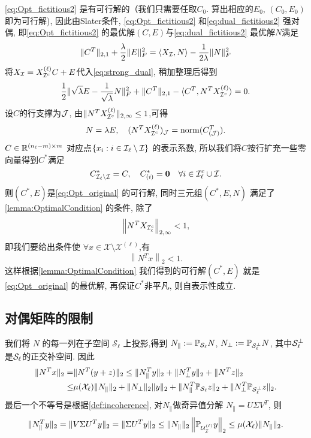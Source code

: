 \eqref{eq:Opt_fictitious2} 是有可行解的（我们只需要任取\(C_0\).
算出相应的\(E_0\), \((C_0, E_0)\)即为可行解), 因此由Slater条件\cite{boyd2004convex},
\eqref{eq:Opt_fictitious2} 和\eqref{eq:dual_fictitious2} 强对偶,
即\eqref{eq:Opt_fictitious2} 的最优解\((C, E)\)与\eqref{eq:dual_fictitious2} 最优解\(N\)满足
\begin{align}\label{eq:strong_dual}
  \|C^T\|_{2,1}+\frac{\lambda}{2}\|E\|_F^2 = \langle X_{\mathcal{I}},N \rangle -
  \frac{1}{2\lambda} \|N\|_F^2   
\end{align}
将\(X_{\mathcal{I}}=X^{(\ell)}_{\mathcal{I}^c}C+E\)代入\eqref{eq:strong_dual},  稍加整理后得到
\[ \frac{1}{2}\| \sqrt{\lambda}E-\frac{1}{\sqrt{\lambda}}N \|_F^2+
\|C^T\|_{2,1}-\langle C^T, N^T X^{(\ell)}_{\mathcal{I}^c}\rangle = 0. \]
设\(C\)的行支撑为\(\mathcal{J}\), 由\(\|N^T X^{(\ell)}_{\mathcal{I}^c}\|_{2, \infty} \leq 1\),可得
\begin{align*}
  N=\lambda E, \quad (N^T X^{(\ell)}_{\mathcal{I}^c})_{\mathcal{J}} =\operatorname{norm}(C_{(\mathcal{J})}^T).
\end{align*}
\(C\in \mathbb{R}^{(n_\ell-m)\times m}\) 对应点\(\{ x_i: i \in \mathcal{I}_\ell \setminus \mathcal{I}\}\)
的表示系数, 所以我们将\(C\)按行扩充一些零向量得到\(C^*\)满足
\[ C^*_{\mathcal{I}_\ell \setminus \mathcal{I}} = C, \quad C^*_{(i)} = \mathbf{0}
\quad \forall i \in \mathcal{I}^c_\ell \cup \mathcal{I}. \]
则\((C^*, E)\)是\eqref{eq:Opt_original} 的可行解, 同时三元组\((C^*, E, N)\)
满足了\autoref{lemma:OptimalCondition} 的条件, 除了
\begin{equation*}
  \left\|N^T X_{\mathcal{I}_\ell^c}\right\|_{2,\infty}<1,
\end{equation*}
即我们要给出条件使 \(\forall x \in \mathcal{X}\setminus \mathcal{X}^{(\ell)}\),有
\begin{equation}\label{eq:dual_separation_condition}
   \left \| N^T x\right \|_2 < 1.
\end{equation}
这样根据\autoref{lemma:OptimalCondition} 我们得到的可行解\((C^*, E)\)
就是\eqref{eq:Opt_original} 的最优解, 再保证\(C^*\)非平凡, 则自表示性成立.

\subsection{对偶矩阵的限制}\label{sec:dual_separation}
我们将 \(N\) 的每一列在子空间 \(\mathcal{S}_{\ell}\) 上投影,得到 \(N_{\parallel}
:=\mathbb{P}_{\mathcal{S}_\ell}N\), \(N_{\perp} := \mathbb{P}_{\mathcal{S}_{\ell}^\perp}N\),
其中\(\mathcal{S}_\ell^\perp\)是\(\mathcal{S}_\ell\)的正交补空间. 因此
\begin{align}\label{eq:showing_dual_sep_cond}
  \| N^T x \|_2 =& \| N^T (y+z)\|_2 \leq \| N_{\parallel}^T y\|_2+\|
  N_{\perp}^T y\|_2+\|N^T z\|_2 \nonumber\\
  \leq& \mu(\mathcal{X}_{\ell}) \|N_{\parallel}\|_2 + \|N_{\perp}\|_2\|y\|_2
  + \|N_{\parallel}^T \mathbb{P}_{\mathcal{S}_{\ell}} z\|_2 
  + \|N_\perp^T \mathbb{P}_{\mathcal{S}_\ell^\perp} z\|_2 .
\end{align}
最后一个不等号是根据\autoref{def:incoherence},   对\(N_\parallel\)做奇异值分解
\(N_\parallel = U\Sigma V^T\), 则
\[
  \|N_\parallel^T y\|_2 = \|V \Sigma U^T y\|_2 = \|\Sigma U^T y\|_2 \le
  \|N_\parallel\|_2 \left\|\mathbb{P}_{\mathcal{U}_{\mathcal{I}}^{(\ell)}} y\right\|_2 \le \mu(\mathcal{X}_\ell)
  \|N_\parallel\|_2.
\]

